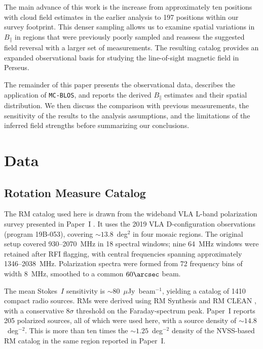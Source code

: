 \documentclass[twocolumn]{aastex701}
\begin{document}
The main advance of this work is the increase from approximately ten positions with cloud field estimates in the earlier analysis to 197 positions within our survey footprint. This denser sampling allows us to examine spatial variations in $B_\parallel$ in regions that were previously poorly sampled and reassess the suggested field reversal with a larger set of measurements. The resulting catalog provides an expanded observational basis for studying the line-of-sight magnetic field in Perseus.

The remainder of this paper presents the observational data, describes the application of \texttt{MC-BLOS}, and reports the derived $B_\parallel$ estimates and their spatial distribution. We then discuss the comparison with previous measurements, the sensitivity of the results to the analysis assumptions, and the limitations of the inferred field strengths before summarizing our conclusions.


\section{Data}
\label{sec:data}

\subsection{Rotation Measure Catalog}

The RM catalog used here is drawn from the wideband VLA L-band polarization
survey presented in Paper~I \citep{hajizadeh2026comprehensive}. It uses the
2019 VLA D-configuration observations (program 19B-053), covering
$\sim 13.8$~deg$^2$ in four mosaic regions. The original setup covered 930--2070~MHz in 18 spectral
windows; nine 64~MHz windows were retained after RFI flagging, with central
frequencies spanning approximately 1346--2038~MHz. Polarization spectra were
formed from 72 frequency bins of width 8~MHz, smoothed to a common
$60\arcsec$ beam. 

The mean Stokes~$I$ sensitivity is $\sim 80$~$\mu$Jy~beam$^{-1}$, yielding a
catalog of 1410 compact radio sources. RMs were derived using RM Synthesis
\citep{burn1966,brentjens2005} and RM CLEAN \citep{heald2009}, with a
conservative $8\sigma$ threshold on the Faraday-spectrum peak. Paper~I
reports 205 polarized sources, all of which were used here, with a source density of $\sim 14.8$~deg$^{-2}$. This is more than
ten times the $\sim 1.25$~deg$^{-2}$ density of the NVSS-based RM catalog
in the same region reported in Paper~I. 
\end{document}

